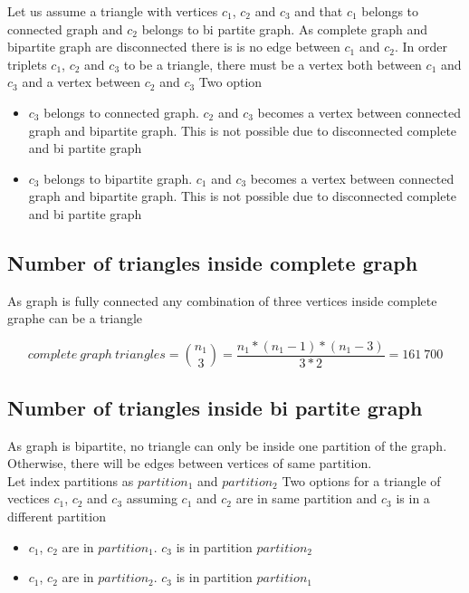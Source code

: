 \documentclass[a4paper]{article}
\begin{document}
Let us assume a triangle with vertices $c_{1}$, $c_{2}$ and $c_{3}$ and that $c_{1}$ belongs to connected graph and $c_{2}$ belongs to bi partite graph. As complete graph and bipartite graph are disconnected there is is no edge between $c_{1}$ and $c_{2}$. In order triplets $c_{1}$, $c_{2}$ and $c_{3}$ to be a triangle, there must be a vertex both between $c_{1}$ and $c_{3}$ and a vertex between $c_{2}$ and $c_{3}$
Two option
\begin{itemize}
\item $c_{3}$ belongs to connected graph. $c_{2}$ and $c_{3}$ becomes a vertex between connected graph and bipartite graph. This is not possible due to disconnected complete and bi partite graph
\item  $c_{3}$ belongs to bipartite graph. $c_{1}$ and $c_{3}$ becomes a vertex between connected graph and bipartite graph. This is not possible due to disconnected complete and bi partite graph
\end{itemize}

\subsection{Number of triangles inside complete graph}

As graph is fully connected any combination of three vertices inside complete graphe can be a triangle

\begin{equation}
complete\ graph\ triangles= \binom{n_{1}}{3} = \frac{n_{1}*(n_{1} - 1)*(n_{1} - 3)}{3* 2} = 161\ 700
\end{equation}

\subsection{Number of triangles inside bi partite graph}

As graph is bipartite, no triangle can only be inside one partition of the graph. Otherwise, there will be edges between vertices of same partition.\\
Let index partitions as $partition_{1}$ and $partition_{2}$
Two options for a triangle of vectices $c_{1}$, $c_{2}$ and $c_{3}$ assuming $c_{1}$ and $c_{2}$ are in same partition and $c_{3}$ is in a different partition
\begin{itemize}
\item $c_{1}$, $c_{2}$ are in $partition_{1}$. $c_{3}$ is in partition $partition_{2}$
\item   $c_{1}$, $c_{2}$ are in $partition_{2}$.  $c_{3}$ is in partition $partition_{1}$
\end{itemize}
\end{document}
